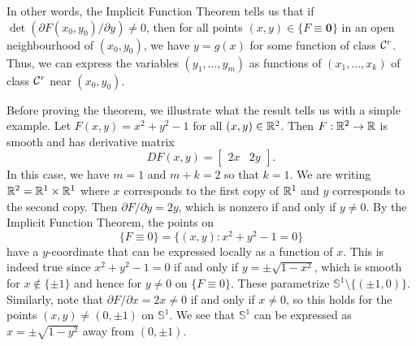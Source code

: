 In other words, the Implicit Function Theorem tells us that if 
$\det(\partial F(x_0, y_0)/\partial y) \neq 0$, then 
for all points $(x, y) \in \{F \equiv \mathbf 0\}$ in an open neighbourhood of 
$(x_0, y_0)$, we have $y = g(x)$ for some function of class ${\cal C}^r$. Thus, 
we can express the variables $(y_1, \dots, y_m)$ as functions of 
$(x_1, \dots, x_k)$ of class ${\cal C}^r$ near $(x_0, y_0)$. 

Before proving the theorem, we illustrate what the result tells us 
with a simple example. Let $F(x, y) = x^2 + y^2 - 1$ for all $(x, y) \in \mathbb{R}^2$. 
Then $F : \mathbb{R}^2 \to \mathbb{R}$ is smooth and has derivative matrix 
\[ DF(x, y) = \begin{bmatrix}
    2x & 2y 
\end{bmatrix}. \] 
In this case, we have $m = 1$ and $m + k = 2$ so that $k = 1$. We are writing 
$\mathbb{R}^2 = \mathbb{R}^1 \times \mathbb{R}^1$ where $x$ corresponds to the first copy of $\mathbb{R}^1$ 
and $y$ corresponds to the second copy. Then $\partial F/\partial y = 2y$, 
which is nonzero if and only if $y \neq 0$. By the Implicit Function 
Theorem, the points on 
\[ \{F \equiv 0\} = \{(x, y) : x^2 + y^2 - 1 = 0\} \] 
have a $y$-coordinate that can be expressed locally as a function of $x$. 
This is indeed true since $x^2 + y^2 - 1 = 0$ if and only if 
$y = \pm\sqrt{1-x^2}$, which is smooth for $x \notin \{\pm1\}$ and hence 
for $y \neq 0$ on $\{F \equiv 0\}$. These parametrize $\mathbb{S}^1 
\setminus \{(\pm1, 0)\}$. Similarly, note that 
$\partial F/\partial x = 2x \neq 0$ if and only if $x \neq 0$, so this 
holds for the points $(x, y) \neq (0, \pm1)$ on $\mathbb{S}^1$. We see that 
$\mathbb{S}^1$ can be expressed as $x = \pm\sqrt{1-y^2}$ away from 
$(0, \pm1)$.

